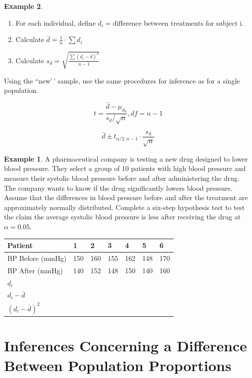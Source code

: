 \documentclass[
  11pt,
  oneside]{book}
\renewcommand{\arraystretch}{1.5} %
\theoremstyle{definition}
\theoremstyle{definition}
\newtheorem{example}{Example}[chapter]
\theoremstyle{definition}
\theoremstyle{definition}
\theoremstyle{remark}
\begin{document}
\begin{example}
\begin{enumerate}
\item For each individual, define $d_i = \text{difference between treatments for subject i}$.
\item Calculate $\bar{d} = \frac{1}{n} \cdot \sum d_i$
\item Calculate $s_d = \sqrt{\frac{\sum(d_i-\bar{d})^2}{n-1}}$
\end{enumerate}

Using the ``new'\,' sample, use the same procedures for inference as for a single population.

\[t = \frac{\bar{d}-\mu_{d_0}}{s_d/\sqrt{n}}, df = n-1\]

\[\bar{d} \pm t_{\alpha/2,n-1} \cdot \frac{s_d}{\sqrt{n}}\]

\newpage

\begin{example}
A pharmaceutical company is testing a new drug designed to lower blood pressure. They select a group of 10 patients with high blood pressure and measure their systolic blood pressure before and after administering the drug. The company wants to know if the drug significantly lowers blood pressure. Assume that the differences in blood pressure before and after the treatment are approximately normally distributed. Complete a six-step hypothesis test to test the claim the average systolic blood pressure is less after receiving the drug at \(\alpha=0.05\).
\end{example}

\begin{table}[h!]
    \centering
    \renewcommand{\arraystretch}{1.5}
    \begin{tabular}{|l|p{1cm}|p{1cm}|p{1cm}|p{1cm}|p{1cm}|p{1cm}|} \hline
    Patient & 1 & 2 & 3 & 4 & 5 & 6 \\ \hline
    BP Before (mmHg) & 150 & 160 & 155 & 162 & 148 & 170 \\ \hline
    BP After (mmHg)  & 140 & 152 & 148 & 150 & 140 & 160 \\ \hline
    $d_i$ & & & & & & \\ \hline
    $d_i - \bar{d}$ & & & & & & \\ \hline
    $(d_i - \bar{d})^2$ & & & & & & \\ \hline
    \end{tabular}
\end{table}

\newpage

\section{Inferences Concerning a Difference Between Population Proportions}\label{inferences-concerning-a-difference-between-population-proportions}


\end{example}
\end{document}
